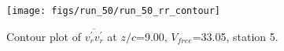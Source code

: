 \begin{figure}[H]
\centering
\texttt{[image: figs/run\_50/run\_50\_rr\_contour]}
\caption{Contour plot of $\overline{v_{r}^{\prime} v_{r}^{\prime}}$ at $z/c$=9.00, $V_{free}$=33.05, station 5.}
\label{fig:run_50_rr_contour}
\end{figure}


